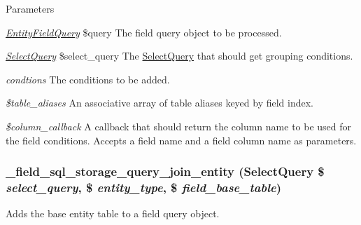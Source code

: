 \begin{DoxyParams}{Parameters}
\item[{\em \hyperlink{classEntityFieldQuery}{EntityFieldQuery}}]\$query The field query object to be processed. \item[{\em \hyperlink{classSelectQuery}{SelectQuery}}]\$select\_\-query The \hyperlink{classSelectQuery}{SelectQuery} that should get grouping conditions. \item[{\em condtions}]The conditions to be added. \item[{\em \$table\_\-aliases}]An associative array of table aliases keyed by field index. \item[{\em \$column\_\-callback}]A callback that should return the column name to be used for the field conditions. Accepts a field name and a field column name as parameters. \end{DoxyParams}
\hypertarget{field__sql__storage_8module_a7af17b34c4165de73746e8cd1b59332b}{
\subsubsection[{\_\-field\_\-sql\_\-storage\_\-query\_\-join\_\-entity}]{\setlength{\rightskip}{0pt plus 5cm}\_\-field\_\-sql\_\-storage\_\-query\_\-join\_\-entity ({\bf SelectQuery} \$ {\em select\_\-query}, \/  \$ {\em entity\_\-type}, \/  \$ {\em field\_\-base\_\-table})}}
\label{field__sql__storage_8module_a7af17b34c4165de73746e8cd1b59332b}
Adds the base entity table to a field query object.


